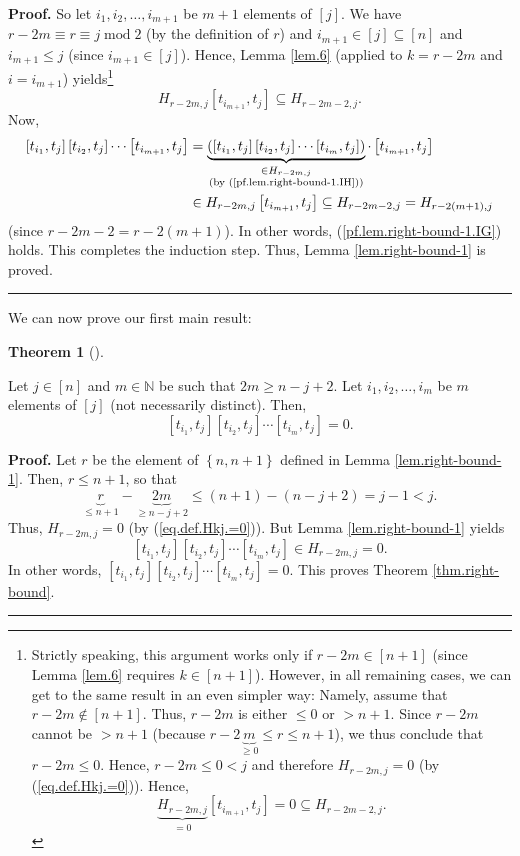 \documentclass[numbers=enddot,12pt,final,onecolumn,notitlepage]{scrartcl}%
\theoremstyle{definition}
\newtheorem{theo}{Theorem}[section]
\newenvironment{theorem}[1][]
{\begin{theo}[#1]\begin{leftbar}}
{\end{leftbar}\end{theo}}
\newenvironment{proof}[1][Proof]{\noindent\textbf{#1.} }{\ \rule{0.5em}{0.5em}}
\begin{document}
\begin{proof}
So let $i_{1},i_{2},\ldots,i_{m+1}$ be $m+1$ elements of $\left[  j\right]  $.
We have $r-2m\equiv r\equiv j\operatorname{mod}2$ (by the definition of $r$)
and $i_{m+1}\in\left[  j\right]  \subseteq\left[  n\right]  $ and $i_{m+1}\leq
j$ (since $i_{m+1}\in\left[  j\right]  $). Hence, Lemma \ref{lem.6} (applied
to $k=r-2m$ and $i=i_{m+1}$) yields\footnote{Strictly speaking, this argument
works only if $r-2m\in\left[  n+1\right]  $ (since Lemma \ref{lem.6} requires
$k\in\left[  n+1\right]  $). However, in all remaining cases, we can get to
the same result in an even simpler way: Namely, assume that $r-2m\notin\left[
n+1\right]  $. Thus, $r-2m$ is either $\leq0$ or $>n+1$. Since $r-2m$ cannot
be $>n+1$ (because $r-2\underbrace{m}_{\geq0}\leq r\leq n+1$), we thus
conclude that $r-2m\leq0$. Hence, $r-2m\leq0<j$ and therefore $H_{r-2m,j}=0$
(by (\ref{eq.def.Hkj.=0})). Hence,%
\[
\underbrace{H_{r-2m,j}}_{=0}\left[  t_{i_{m+1}},t_{j}\right]  =0\subseteq
H_{r-2m-2,j}.
\]
}
\[
H_{r-2m,j}\left[  t_{i_{m+1}},t_{j}\right]  \subseteq H_{r-2m-2,j}.
\]
Now,%
\begin{align*}
\left[  t_{i_{1}},t_{j}\right]  \left[  t_{i_{2}},t_{j}\right]  \cdots\left[
t_{i_{m+1}},t_{j}\right]   &  =\underbrace{\left(  \left[  t_{i_{1}}%
,t_{j}\right]  \left[  t_{i_{2}},t_{j}\right]  \cdots\left[  t_{i_{m}}%
,t_{j}\right]  \right)  }_{\substack{\in H_{r-2m,j}\\\text{(by
(\ref{pf.lem.right-bound-1.IH}))}}}\cdot\left[  t_{i_{m+1}},t_{j}\right] \\
&  \in H_{r-2m,j}\left[  t_{i_{m+1}},t_{j}\right]  \subseteq H_{r-2m-2,j}%
=H_{r-2\left(  m+1\right)  ,j}%
\end{align*}
(since $r-2m-2=r-2\left(  m+1\right)  $). In other words,
(\ref{pf.lem.right-bound-1.IG}) holds. This completes the induction step.
Thus, Lemma \ref{lem.right-bound-1} is proved.
\end{proof}

We can now prove our first main result:


\begin{theorem}
\label{thm.right-bound}Let $j\in\left[  n\right]  $ and $m\in\mathbb{N}$ be
such that $2m\geq n-j+2$. Let $i_{1},i_{2},\ldots,i_{m}$ be $m$ elements of
$\left[  j\right]  $ (not necessarily distinct). Then,
\[
\left[  t_{i_{1}},t_{j}\right]  \left[  t_{i_{2}},t_{j}\right]  \cdots\left[
t_{i_{m}},t_{j}\right]  =0.
\]

\end{theorem}


\begin{proof}
Let $r$ be the element of $\left\{  n,n+1\right\}  $ defined in Lemma
\ref{lem.right-bound-1}. Then, $r\leq n+1$, so that%
\[
\underbrace{r}_{\leq n+1}-\underbrace{2m}_{\geq n-j+2}\leq\left(  n+1\right)
-\left(  n-j+2\right)  =j-1<j.
\]
Thus, $H_{r-2m,j}=0$ (by (\ref{eq.def.Hkj.=0})). But Lemma
\ref{lem.right-bound-1} yields%
\[
\left[  t_{i_{1}},t_{j}\right]  \left[  t_{i_{2}},t_{j}\right]  \cdots\left[
t_{i_{m}},t_{j}\right]  \in H_{r-2m,j}=0.
\]
In other words, $\left[  t_{i_{1}},t_{j}\right]  \left[  t_{i_{2}}%
,t_{j}\right]  \cdots\left[  t_{i_{m}},t_{j}\right]  =0$. This proves Theorem
\ref{thm.right-bound}.
\end{proof}
\end{document}
